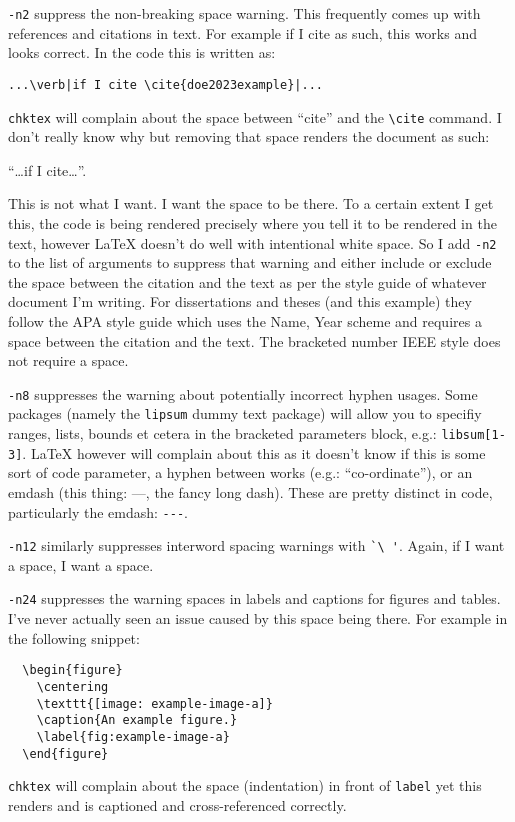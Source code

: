 \documentclass{thesis-dissertation}
\begin{document}
\texttt{-n2} suppress the non-breaking space warning. This frequently comes up with references and citations in text. For example if I cite \cite{doe2023example} as such, this works and looks correct. In the code this is written as:\begin{center}\begin{verbatim}...\verb|if I cite \cite{doe2023example}|...\end{verbatim}\end{center}\verb|chktex| will complain about the space between ``cite'' and the \verb|\cite| command. I don't really know why but removing that space renders the document as such: \begin{center}
``\ldots if I cite\cite{doe2023example}\ldots''. 
\end{center} This is not what I want. I want the space to be there. To a certain extent I get this, the code is being rendered precisely where you tell it to be rendered in the text, however \LaTeX{} doesn't do well with intentional white space. So I add \texttt{-n2} to the list of arguments to suppress that warning and either include or exclude the space between the citation and the text as per the style guide of whatever document I'm writing. For dissertations and theses (and this example) they follow the APA style guide which uses the Name, Year scheme and requires a space between the citation and the text. The bracketed number IEEE style does not require a space.

\texttt{-n8} suppresses the warning about potentially incorrect hyphen usages. Some packages (namely the \texttt{lipsum} dummy text package) will allow you to specifiy ranges, lists, bounds et cetera in the bracketed parameters block, e.g.: \verb|libsum[1-3]|. \LaTeX{} however will complain about this as it doesn't know if this is some sort of code parameter, a hyphen between works (e.g.: ``co-ordinate''), or an emdash (this thing: ---, the fancy long dash). These are pretty distinct in code, particularly the emdash: \verb|---|. 

\texttt{-n12} similarly suppresses interword spacing warnings with \verb|`\ '|. Again, if I want a space, I want a space.

\texttt{-n24} suppresses the warning spaces in labels and captions for figures and tables. I've never actually seen an issue caused by this space being there. For example in the following snippet:\begin{verbatim}
  \begin{figure}
    \centering
    \texttt{[image: example-image-a]}
    \caption{An example figure.}
    \label{fig:example-image-a}
  \end{figure}\end{verbatim}\texttt{chktex} will complain about the space (indentation) in front of \verb|label| yet this renders and is captioned and cross-referenced correctly.
\end{document}
